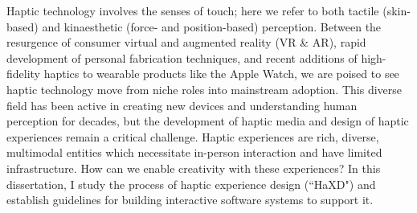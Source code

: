 Haptic technology involves the senses of touch; here we refer to both tactile (skin-based) and kinaesthetic (force- and position-based) perception.
Between the resurgence of consumer virtual and augmented reality (VR \& AR), rapid development of personal fabrication techniques, and recent additions of high-fidelity haptics to wearable products like the Apple Watch, we are poised to see haptic technology move from niche roles into mainstream adoption.
This diverse field has been active in creating new devices and understanding human perception for decades, but the development of haptic media and design of haptic experiences remain a critical challenge.
Haptic experiences are rich, diverse, multimodal entities which necessitate in-person interaction and have limited infrastructure.
How can we enable creativity with these experiences?
In this dissertation, I study the process of haptic experience design (``HaXD") and establish guidelines for building interactive software systems to support it.
%
%
%
